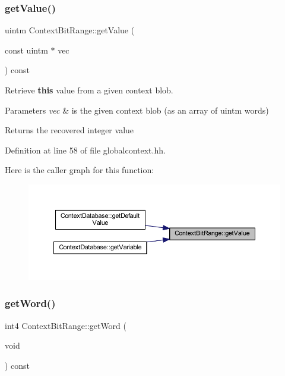 \subsubsection{\texorpdfstring{getValue()}{getValue()}}
{\footnotesize\ttfamily uintm Context\+Bit\+Range\+::get\+Value (\begin{DoxyParamCaption}\item[{const uintm $\ast$}]{vec }\end{DoxyParamCaption}) const\hspace{0.3cm}{\ttfamily [inline]}}



Retrieve {\bfseries{this}} value from a given context blob. 


\begin{DoxyParams}{Parameters}
{\em vec} & is the given context blob (as an array of uintm words) \\
\hline
\end{DoxyParams}
\begin{DoxyReturn}{Returns}
the recovered integer value 
\end{DoxyReturn}


Definition at line 58 of file globalcontext.\+hh.

Here is the caller graph for this function\+:
\nopagebreak
\begin{figure}[H]
\begin{center}
\leavevmode
\includegraphics[width=350pt]{class_context_bit_range_a1086e19201eadfc91d14a589d07edab9_icgraph}
\end{center}
\end{figure}
\mbox{\label{class_context_bit_range_a95f4ce54e8e572278d51fce6e61a4cf1}} 
\subsubsection{\texorpdfstring{getWord()}{getWord()}}
{\footnotesize\ttfamily int4 Context\+Bit\+Range\+::get\+Word (\begin{DoxyParamCaption}\item[{void}]{ }\end{DoxyParamCaption}) const\hspace{0.3cm}{\ttfamily [inline]}}



